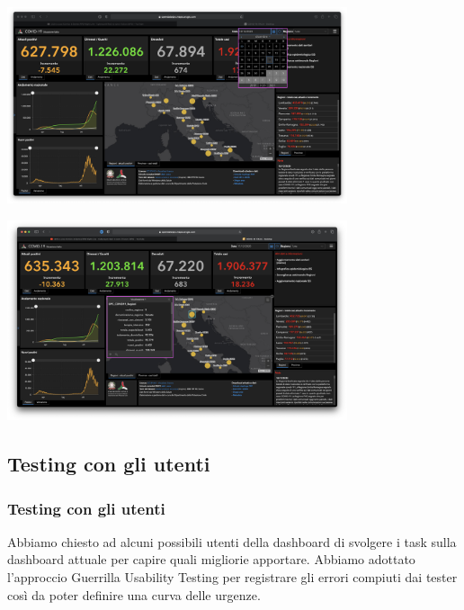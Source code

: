 \documentclass[handout]{beamer}
\begin{document}
			\begin{frame}
				\includegraphics[width=10cm]{img/guidelines_violations_8}	
			\end{frame}

			\begin{frame}
				\includegraphics[width=10cm]{img/guidelines_violations_10}
			\end{frame}


		\subsection{Testing con gli utenti}

			\begin{frame}
				\frametitle{Testing con gli utenti}
				Abbiamo chiesto ad alcuni possibili utenti della dashboard di svolgere i task sulla dashboard attuale per capire quali migliorie apportare. \newline \newline
				Abbiamo adottato l'approccio Guerrilla Usability Testing per registrare gli errori compiuti dai tester così da poter definire una curva delle urgenze.
			\end{frame}
\end{document}
